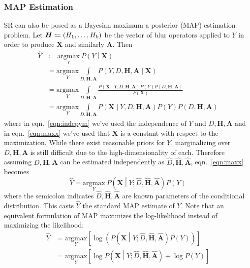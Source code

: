 \subsubsection{MAP Estimation}
SR can also be posed as a Bayesian maximum a posterior (MAP) estimation problem.
%
Let \(\bm{H} \coloneqq \left( H_1, \mathellipsis, H_k \right)\) be the vector of blur operators applied to \(Y\) in order to produce \(\bm{X}\) and similarly \(\bm{A}\).
%
Then
\begin{align}
    \hat{Y} & \coloneqq \underset{Y}{\text{argmax}}~P\left( Y \middle| \bm{X} \right) \nonumber                                                                                        \\
            & = \underset{Y}{\text{argmax}} \int\limits_{D, \bm{H}, \bm{A}} P\left( Y, D, \bm{H}, \bm{A} \middle| \bm{X}\right) \nonumber                                                     \\
            & = \underset{Y}{\text{argmax}} \int\limits_{D, \bm{H}, \bm{A}} \frac{P\left(\bm{X} \middle| Y, D, \bm{H}, \bm{A} \right)P(Y) P(D, \bm{H}, \bm{A})}{P(\bm{X})}\label{eqn:indepym} \\
            & = \underset{Y}{\text{argmax}} \int\limits_{D, \bm{H}, \bm{A}} P\left(\bm{X} \middle| Y, D, \bm{H}, \bm{A} \right)P(Y) P(D, \bm{H}, \bm{A}) \label{eqn:maxx}
\end{align}
where in eqn.~\eqref{eqn:indepym} we've used the independence of \(Y\) and \(D, \bm{H}, \bm{A}\) \cite{Hardie1997} and in eqn.~\eqref{eqn:maxx} we've used that \(\bm{X}\) is a constant with respect to the maximization.
%
While there exist reasonable priors for \(Y\), marginalizing over \(D, \bm{H}, \bm{A}\) is still difficult due to the high-dimensionality of each.
%
Therefore assuming \(D, \bm{H}, \bm{A}\) can be estimated independently as \(\hat{D}, \hat{\bm{H}}, \hat{\bm{A}}\), eqn.~\eqref{eqn:maxx} becomes
\begin{equation}
    \hat{Y} = \underset{Y}{\text{argmax}}~P\left(\bm{X} \middle| Y; \hat{D}, \hat{\bm{H}}, \hat{\bm{A}} \right) P(Y)
    \label{eqn:map}
\end{equation}
where the semicolon indicates \(\hat{D}, \hat{\bm{H}}, \hat{\bm{A}}\) are known parameters of the conditional distribution.
%
This casts \(\hat{Y}\) the standard MAP estimate of \(Y\).
%
Note that an equivalent formulation of MAP maximizes the log-likelihood instead of maximizing the likelihood:
\begin{align}
    \hat{Y} & = \underset{Y}{\text{argmax}}\left[ \log\left( P\left(\bm{X} \middle| Y; \hat{D},  \hat{\bm{H}}, \hat{\bm{A}}\right) P(Y) \right) \right]  \nonumber \\
            & =  \underset{Y}{\text{argmax}}\left[ \log{P\left(\bm{X} \middle| Y; \hat{D},  \hat{\bm{H}}, \hat{\bm{A}} \right)} + \log{P(Y)} \right]
    \label{eqn:logmap}
\end{align}

